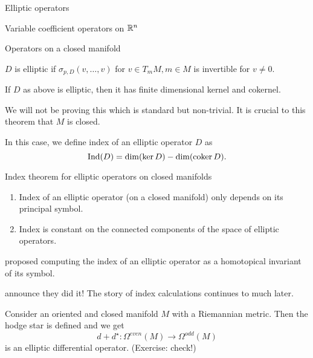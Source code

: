 \begin{clear}{Elliptic operators}
\begin{clear}{Variable coefficient operators on $\mathbb{R}^n$}
\begin{clear}{Operators on a closed manifold}
\begin{defn}$D$ is elliptic if $\sigma_{p,D} (v,\dots , v)$ for $v \in T_m M, m \in M$ is invertible for $v \neq 0$. 
\end{defn}
\end{clear}

\begin{thm}
If $D$ as above is elliptic, then it has finite dimensional kernel and cokernel.
\end{thm}
We will not be proving this which is standard but non-trivial. It is crucial to this theorem that $M$ is closed.

\begin{defn}
In this case, we define index of an elliptic operator  $D$ as $$\mathrm{Ind}(D) = \dim (\ker D) -  \dim ( \operatorname{\mathrm{coker}} D).$$
\end{defn}
\end{clear}


\begin{clear}{Index theorem for elliptic operators on closed manifolds}
\begin{thm} 
\begin{enumerate}
\item[a.] Index of an elliptic operator (on a closed manifold) only depends on its principal symbol.
\item[b.] Index is constant on the connected components of the space of elliptic operators.
\end{enumerate}
\end{thm}
\end{clear}

 proposed computing the index of an elliptic operator as a homotopical invariant of its symbol.

 announce they did it! The story of index calculations continues to much later.

\begin{example}
Consider an oriented and closed manifold $M$ with a Riemannian metric. Then the hodge star is defined and we get
$$ d + d^\star : \Omega^{even}(M) \to \Omega^{odd} (M)$$
is an elliptic differential operator. (Exercise: check!)


\end{example}
\end{clear}

